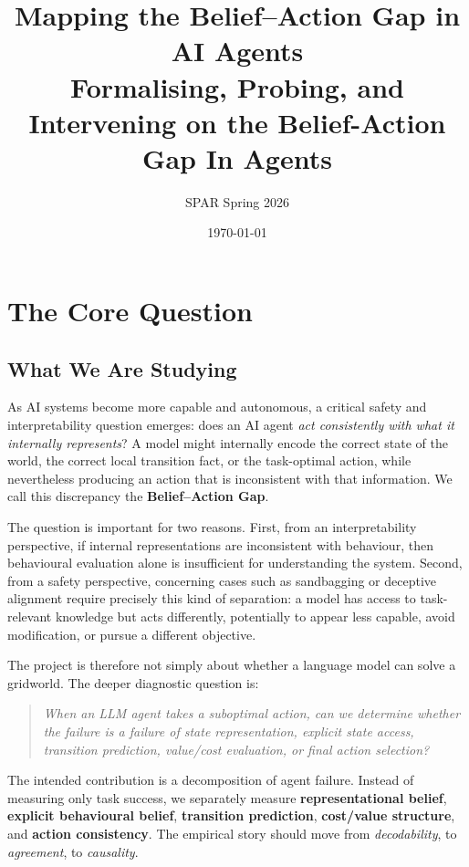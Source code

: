 \documentclass[11pt,a4paper]{article}
\title{\textbf{Mapping the Belief--Action Gap in AI Agents}\\
\large Formalising, Probing, and Intervening on the Belief-Action Gap In Agents}
\author{SPAR Spring 2026}
\date{\today}
\begin{document}
\maketitle
\tableofcontents
\newpage

\section{The Core Question}

\subsection{What We Are Studying}

As AI systems become more capable and autonomous, a critical safety and interpretability question emerges: does an AI agent \emph{act consistently with what it internally represents}? A model might internally encode the correct state of the world, the correct local transition fact, or the task-optimal action, while nevertheless producing an action that is inconsistent with that information. We call this discrepancy the \textbf{Belief--Action Gap}.

The question is important for two reasons. First, from an interpretability perspective, if internal representations are inconsistent with behaviour, then behavioural evaluation alone is insufficient for understanding the system. Second, from a safety perspective, concerning cases such as sandbagging or deceptive alignment require precisely this kind of separation: a model has access to task-relevant knowledge but acts differently, potentially to appear less capable, avoid modification, or pursue a different objective.

The project is therefore not simply about whether a language model can solve a gridworld. The deeper diagnostic question is:

\begin{quote}
\emph{When an LLM agent takes a suboptimal action, can we determine whether the failure is a failure of state representation, explicit state access, transition prediction, value/cost evaluation, or final action selection?}
\end{quote}

\begin{insight}
The intended contribution is a decomposition of agent failure. Instead of measuring only task success, we separately measure \textbf{representational belief}, \textbf{explicit behavioural belief}, \textbf{transition prediction}, \textbf{cost/value structure}, and \textbf{action consistency}. The empirical story should move from \emph{decodability}, to \emph{agreement}, to \emph{causality}.
\end{insight}
\end{document}
